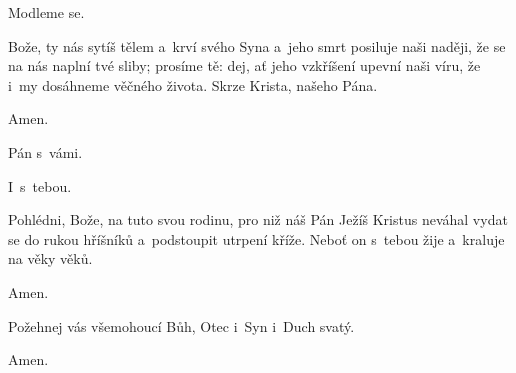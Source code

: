 \mbox{}

Modleme se.

Bože, ty nás sytíš tělem a~krví svého Syna a~jeho smrt posiluje naši naději, že se na nás naplní tvé sliby; prosíme tě: dej, ať jeho vzkříšení upevní naši víru, že i~my dosáhneme věčného života. Skrze Krista, našeho Pána.

\Rbardot{} Amen.

\mbox{}

\mbox{}

\Vbardot{} Pán s~vámi.

\Rbardot{} I~s~tebou.

\mbox{}

Pohlédni, Bože, na tuto svou rodinu, pro niž náš Pán Ježíš Kristus neváhal vydat se do rukou hříšníků a~podstoupit utrpení kříže. Neboť on s~tebou žije a~kraluje na věky věků.

\Rbardot{} Amen.

Požehnej vás všemohoucí Bůh, Otec i~Syn \grecross{} i~Duch svatý.

\Rbardot{} Amen.
